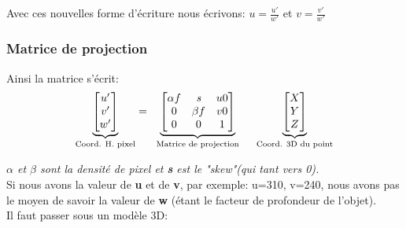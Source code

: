 \documentclass[12pt, french]{report}
\begin{document}
Avec ces nouvelles forme d'écriture nous écrivons: $u=\frac{u'}{w'}$ et $v=\frac{v'}{w'}$

\subsubsection{Matrice de projection}
Ainsi la matrice s'écrit:
$$\begin{matrix}
    
    \underbrace{\begin{bmatrix}
        u'\\v'\\w'\\
    \end{bmatrix}}_{\text{Coord. H. pixel}}
    
    =\hspace{0.2cm}
    
    \underbrace{\begin{bmatrix}
        \alpha f & \textit{s} & u0\\
        0 & \beta f & v0\\
        0 & 0 & 1\\
    \end{bmatrix}}_{\text{Matrice de projection}}
    
    \hspace{0.5cm}
    
    \underbrace{\begin{bmatrix}
        X\\Y\\Z\\
    \end{bmatrix}}_{\text{Coord. 3D du point}}
\end{matrix}$$

\textit{ \textbf{$\alpha$} et \textbf{$\beta$} sont la densité de pixel et \textbf{s} est le "skew"(qui tant vers 0).}\\

Si nous avons la valeur de \textbf{u} et de \textbf{v}, par exemple: u=310, v=240, nous avons pas le moyen de savoir la valeur de \textbf{w} (étant le facteur de profondeur de l'objet).\\
Il faut passer sous un modèle 3D:
\end{document}
